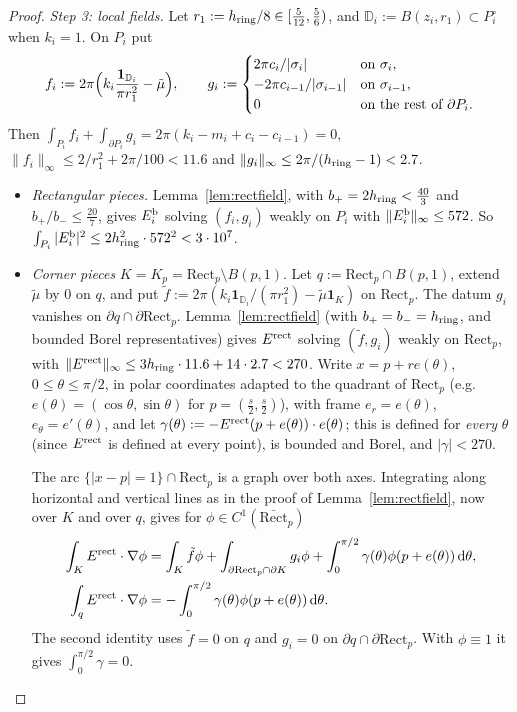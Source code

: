 \documentclass[11pt]{article}
\theoremstyle{definition}
\theoremstyle{remark}
\newcommand{\dd}{\,\mathrm d}
\begin{document}
\begin{proof}
\emph{Step 3: local fields.} Let $r_1:=h_{\rm ring}/8\in[\tfrac5{12},\tfrac56)$, and
$\mathbb D_i:=B(z_i,r_1)\subset P_i^\circ$ when $k_i=1$. On $P_i$ put
\[
f_i:=2\pi\Bigl(k_i\frac{\mathbf 1_{\mathbb D_i}}{\pi r_1^2}-\tilde\mu\Bigr),\qquad
g_i:=\begin{cases}2\pi c_i/|\sigma_i|&\text{on }\sigma_i,\\-2\pi c_{i-1}/|\sigma_{i-1}|&\text{on }\sigma_{i-1},\\0&\text{on the rest of }\partial P_i.\end{cases}
\]
Then $\int_{P_i}f_i+\int_{\partial P_i}g_i=2\pi(k_i-m_i+c_i-c_{i-1})=0$,
$\|f_i\|_\infty\le2/r_1^2+2\pi/100<11.6$ and $\|g_i\|_\infty\le2\pi/(h_{\rm ring}-1)<2.7$.
\begin{itemize}[leftmargin=*]
\item \emph{Rectangular pieces.} Lemma~\ref{lem:rectfield}, with $b_+=2h_{\rm ring}<\tfrac{40}3$ and
  $b_+/b_-\le\tfrac{20}7$, gives $E_i^{\rm b}$ solving $(f_i,g_i)$ weakly on $P_i$ with
  $\|E_i^{\rm b}\|_\infty\le572$. So $\int_{P_i}|E_i^{\rm b}|^2\le2h_{\rm ring}^2\cdot572^2<3\cdot10^7$.
\item \emph{Corner pieces} $K=K_p=\mathrm{Rect}_p\setminus B(p,1)$. Let $q:=\mathrm{Rect}_p\cap B(p,1)$, extend
  $\tilde\mu$ by $0$ on $q$, and put
  $\tilde f:=2\pi(k_i\mathbf 1_{\mathbb D_i}/(\pi r_1^2)-\tilde\mu\mathbf 1_K)$ on $\mathrm{Rect}_p$. The datum
  $g_i$ vanishes on $\partial q\cap\partial\mathrm{Rect}_p$. Lemma~\ref{lem:rectfield} (with
  $b_+=b_-=h_{\rm ring}$, and bounded Borel representatives) gives $E^{\rm rect}$ solving $(\tilde f,g_i)$
  weakly on $\mathrm{Rect}_p$, with $\|E^{\rm rect}\|_\infty\le3h_{\rm ring}\cdot11.6+14\cdot2.7<270$. Write
  $x=p+re(\theta)$, $0\le\theta\le\pi/2$, in polar coordinates adapted to the quadrant of $\mathrm{Rect}_p$
  (e.g.\ $e(\theta)=(\cos\theta,\sin\theta)$ for $p=(\tfrac s2,\tfrac s2)$), with frame $e_r=e(\theta)$,
  $e_\theta=e'(\theta)$, and let
  $\gamma(\theta):=-E^{\rm rect}(p+e(\theta))\cdot e(\theta)$; this is defined for \emph{every} $\theta$
  (since $E^{\rm rect}$ is defined at every point), is bounded and Borel, and
  $|\gamma|<270$.

  The arc $\{|x-p|=1\}\cap\mathrm{Rect}_p$ is a graph over both axes. Integrating along horizontal and
  vertical lines as in the proof of Lemma~\ref{lem:rectfield}, now over $K$ and over $q$, gives for
  $\phi\in C^1(\bar{\mathrm{Rect}}_p)$
  \begin{align*}
  \int_KE^{\rm rect}\cdot\nabla\phi&=\int_K\tilde f\phi+\int_{\partial\mathrm{Rect}_p\cap\partial K}g_i\phi+\int_0^{\pi/2}\gamma(\theta)\phi(p+e(\theta))\dd\theta,\\
  \int_qE^{\rm rect}\cdot\nabla\phi&=-\int_0^{\pi/2}\gamma(\theta)\phi(p+e(\theta))\dd\theta .
  \end{align*}
  The second identity uses $\tilde f=0$ on $q$ and $g_i=0$ on $\partial q\cap\partial\mathrm{Rect}_p$. With
  $\phi\equiv1$ it gives $\int_0^{\pi/2}\gamma=0$.


\end{itemize}
\end{proof}
\end{document}
